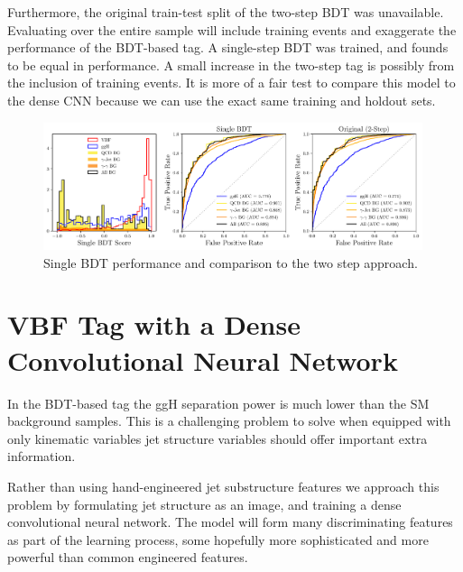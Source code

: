Furthermore, the original train-test split of the two-step BDT was unavailable. Evaluating over the entire sample will include training events and exaggerate the performance of the BDT-based tag. 
A single-step BDT was trained, and founds to be equal in performance. A small increase in the two-step tag is possibly from the inclusion of training events. 
It is more of a fair test to compare this model to the dense CNN because we can use the exact same training and holdout sets. 
\begin{figure}[h!]
    \centering
    \includegraphics[width=0.99\textwidth]{figures/event_selection/dijet_BDT_PS_unw.pdf}
    \caption{Single BDT performance and comparison to the two step approach.}
    \label{fig:event_categorisation:single_BDT}
\end{figure}

















\section[DCNN VBF Tag]{VBF Tag with a Dense Convolutional Neural Network}
In the BDT-based tag the ggH separation power is much lower than the SM background samples. 
This is a challenging problem to solve when equipped with only kinematic variables jet structure variables should offer important extra information.

Rather than using hand-engineered jet substructure features we approach this problem by formulating jet structure as an image, and training a dense convolutional neural network.
The model will form many discriminating features as part of the learning process, some hopefully more sophisticated  and more powerful than common engineered features. 

